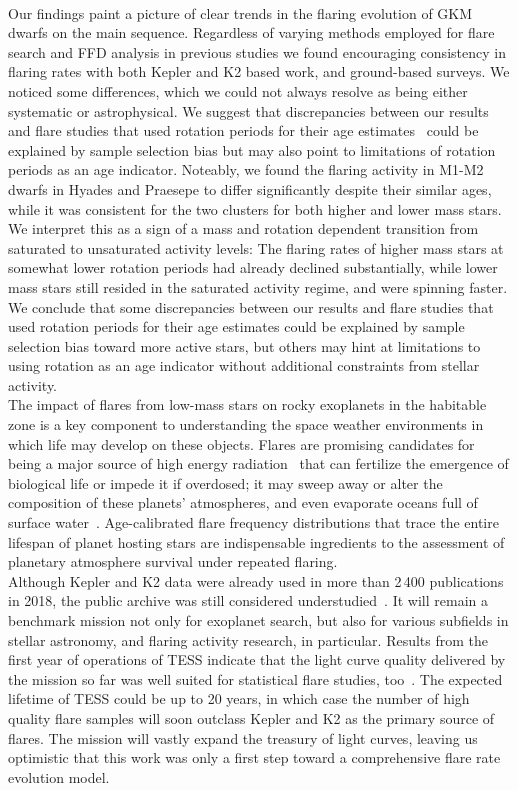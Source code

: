 \documentclass{aa}
\begin{document}
\\
Our findings paint a picture of clear trends in the flaring evolution of GKM dwarfs on the main sequence. Regardless of varying methods employed for flare search and FFD analysis in previous studies we found encouraging consistency in flaring rates with both Kepler and K2 based work, and ground-based surveys. We noticed some differences, which we could not always resolve as being either systematic or astrophysical. We suggest that discrepancies between our results and flare studies that used rotation periods for their age estimates~\citep{davenport2019, raetz2020} could be explained by sample selection bias but may also point to limitations of rotation periods as an age indicator. Noteably, we found the flaring activity in M1-M2 dwarfs in Hyades and Praesepe to differ significantly despite their similar ages, while it was consistent for the two clusters for both higher and lower mass stars. We interpret this as a sign of a mass and rotation dependent transition from saturated to unsaturated activity levels: The flaring rates of higher mass stars at somewhat lower rotation periods had already declined substantially, while lower mass stars still resided in the saturated activity regime, and were spinning faster. We conclude that some discrepancies between our results and flare studies that used rotation periods for their age estimates could be explained by sample selection bias toward more active stars, but others may hint at limitations to using rotation as an age indicator without additional constraints from stellar activity. 
\\
The impact of flares from low-mass stars on rocky exoplanets in the habitable zone is a key component to understanding the space weather environments in which life may develop on these objects. Flares are promising candidates for being a major source of high energy radiation~\citep{airapetian2020} that can fertilize the emergence of biological life or impede it if overdosed; it may sweep away or alter the composition of these planets' atmospheres, and even evaporate oceans full of surface water~\citep{shields2016, tilley2019}. Age-calibrated flare frequency distributions that trace the entire lifespan of planet hosting stars are indispensable ingredients to the assessment of planetary atmosphere survival under repeated flaring. 
\\
Although Kepler and K2 data were already used in more than 2\,400 publications in 2018, the public archive was still considered understudied~\citep{barentsen_retirement_opportunities_2018}. It will remain a benchmark mission not only for exoplanet search, but also for various subfields in stellar astronomy, and flaring activity research, in particular. Results from the first year of operations of TESS indicate that the light curve quality delivered by the mission so far was well suited for statistical flare studies, too~\citep{doyle2020,guenther2020, feinstein2020}. The expected lifetime of TESS could be up to 20 years, in which case the number of high quality flare samples will soon outclass Kepler and K2 as the primary source of flares. The mission will vastly expand the treasury of light curves, leaving us optimistic that this work was only a first step toward a comprehensive flare rate evolution model. 
\end{document}
